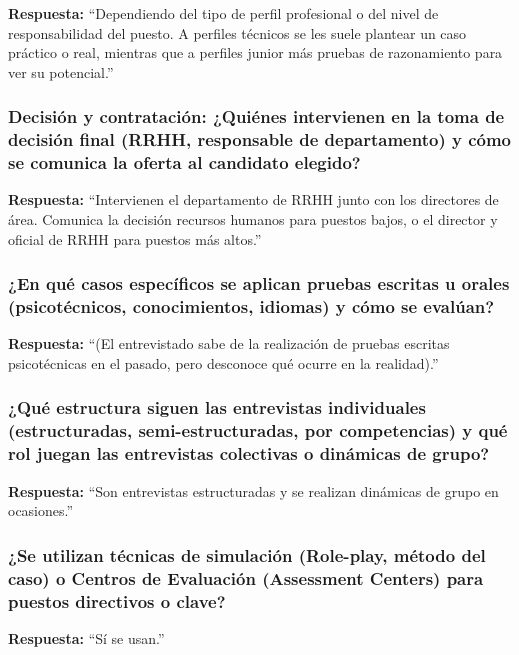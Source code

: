 \textbf{Respuesta:}\newline
``Dependiendo del tipo de perfil profesional o del nivel de responsabilidad del puesto. A perfiles técnicos se les suele plantear un caso práctico o real, mientras que a perfiles junior más pruebas de razonamiento para ver su potencial.''

\subsubsection*{Decisión y contratación: ¿Quiénes intervienen en la toma de decisión final (RRHH, responsable de departamento) y cómo se comunica la oferta al candidato elegido?}

\textbf{Respuesta:}\newline
``Intervienen el departamento de RRHH junto con los directores de área. Comunica la decisión recursos humanos para puestos bajos, o el director y oficial de RRHH para puestos más altos.''

\subsubsection*{¿En qué casos específicos se aplican pruebas escritas u orales (psicotécnicos, conocimientos, idiomas) y cómo se evalúan?}

\textbf{Respuesta:}\newline
``(El entrevistado sabe de la realización de pruebas escritas psicotécnicas en el pasado, pero desconoce qué ocurre en la realidad).''

\subsubsection*{¿Qué estructura siguen las entrevistas individuales (estructuradas, semi-estructuradas, por competencias) y qué rol juegan las entrevistas colectivas o dinámicas de grupo?}

\textbf{Respuesta:}\newline
``Son entrevistas estructuradas y se realizan dinámicas de grupo en ocasiones.''

\subsubsection*{¿Se utilizan técnicas de simulación (Role-play, método del caso) o Centros de Evaluación (Assessment Centers) para puestos directivos o clave?}

\textbf{Respuesta:}\newline
``Sí se usan.''

